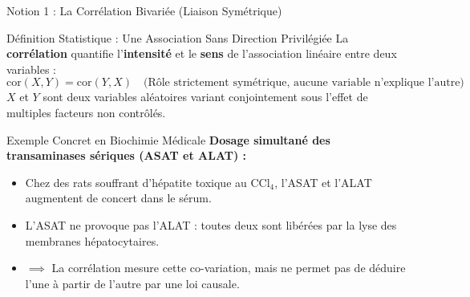 \documentclass[aspectratio=169,10pt]{beamer}
\begin{document}
\begin{frame}{Notion 1 : La Corrélation Bivariée (Liaison Symétrique)}
  \begin{conceptbox}{Définition Statistique : Une Association Sans Direction Privilégiée}
    \footnotesize
    La \textbf{corrélation} quantifie l'\textbf{intensité} et le \textbf{sens} de l'association linéaire entre deux variables :
    \begin{equation*}
      \text{cor}(X,Y) = \text{cor}(Y,X) \quad \text{(Rôle strictement symétrique, aucune variable n'explique l'autre)}
    \end{equation*}
    $X$ et $Y$ sont deux variables aléatoires variant conjointement sous l'effet de multiples facteurs non contrôlés.
  \end{conceptbox}
  \vspace{1mm}
  \begin{biobox}{Exemple Concret en Biochimie Médicale}
    \footnotesize
    \textbf{Dosage simultané des transaminases sériques (ASAT et ALAT) :}
    \begin{itemize}
      \item Chez des rats souffrant d'hépatite toxique au $\text{CCl}_4$, l'ASAT et l'ALAT augmentent de concert dans le sérum.
      \item L'ASAT ne provoque pas l'ALAT : toutes deux sont libérées par la lyse des membranes hépatocytaires.
      \item $\implies$ La corrélation mesure cette co-variation, mais ne permet pas de déduire l'une à partir de l'autre par une loi causale.
    \end{itemize}
  \end{biobox}
\end{frame}
\end{document}
